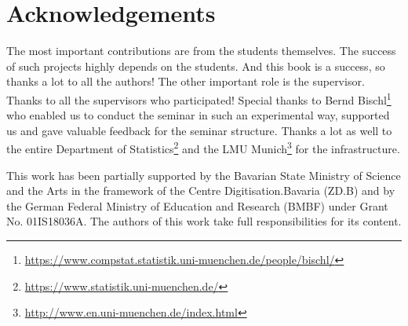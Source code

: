\documentclass[]{krantz}
\renewcommand{\href}[2]{#2\footnote{\url{#1}}}
\begin{document}
\chapter{Acknowledgements}\label{acknowledgements}

The most important contributions are from the students themselves. The
success of such projects highly depends on the students. And this book
is a success, so thanks a lot to all the authors! The other important
role is the supervisor. Thanks to all the supervisors who participated!
Special thanks to
\href{https://www.compstat.statistik.uni-muenchen.de/people/bischl/}{Bernd
Bischl} who enabled us to conduct the seminar in such an experimental
way, supported us and gave valuable feedback for the seminar structure.
Thanks a lot as well to the entire
\href{https://www.statistik.uni-muenchen.de/}{Department of Statistics}
and the \href{http://www.en.uni-muenchen.de/index.html}{LMU Munich} for
the infrastructure.

This work has been partially supported by the Bavarian State Ministry of
Science and the Arts in the framework of the Centre Digitisation.Bavaria
(ZD.B) and by the German Federal Ministry of Education and Research
(BMBF) under Grant No. 01IS18036A. The authors of this work take full
responsibilities for its content.



\backmatter
\printindex
\end{document}
